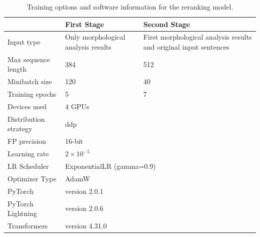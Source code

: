 \documentclass[AMS,STIX2COL]{WileyNJD-v2}
\begin{document}
    \begin{table}[ht]
        \centering
        \footnotesize
        \caption{Training options and software information for the reranking model.}
        \label{tab:training-options}
        \begin{tabular}{|p{24mm}|p{25mm}|p{25mm}|}
            \hline
            ~                     & \textbf{First Stage}                & \textbf{Second Stage}                                             \\ \hline
            Input type            & Only morphological analysis results & First morphological analysis results and original input sentences \\ \hline
            Max sequence length   & 384                                 & 512                                                               \\ \hline
            Minibatch size        & 120                                 & 40                                                                \\ \hline
            Training epochs       & 5                                   & 7                                                                 \\ \hline
            Devices used          & \multicolumn{2}{l|}{4 GPUs}                                                                             \\ \hline
            Distribution strategy & \multicolumn{2}{l|}{ddp}                                                                                \\ \hline
            FP precision          & \multicolumn{2}{l|}{16-bit}                                                                             \\ \hline
            Learning rate         & \multicolumn{2}{l|}{$2 \times 10^{-5}$}                                                                 \\ \hline
            LR Scheduler          & \multicolumn{2}{l|}{ExponentialLR (gamma=0.9)}                                                          \\ \hline
            Optimizer Type        & \multicolumn{2}{l|}{AdamW}                                                                              \\ \hline
            PyTorch               & \multicolumn{2}{l|}{version 2.0.1}                                                                      \\ \hline
            PyTorch Lightning     & \multicolumn{2}{l|}{version 2.0.6}                                                                      \\ \hline
            Transformers          & \multicolumn{2}{l|}{version 4.31.0}                                                                     \\ \hline
        \end{tabular}
    \end{table}
\end{document}
